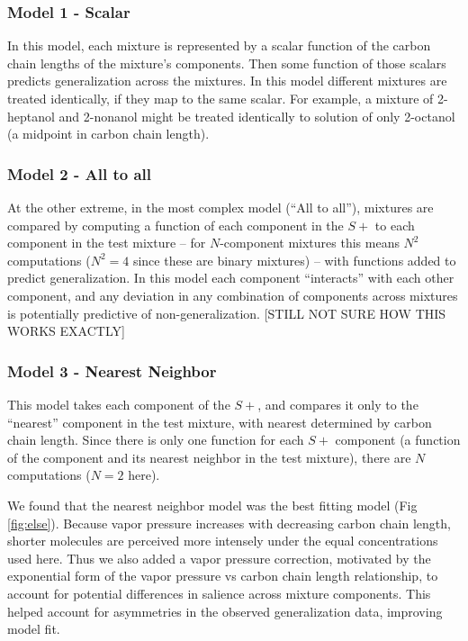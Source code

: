 \subsubsection{Model 1 - Scalar}
\label{sec:scalar_model}
In this model, each mixture is represented by a scalar function of the carbon chain lengths of the mixture’s components.  Then some function of those scalars predicts generalization across the mixtures.  In this model different mixtures are treated identically, if they map to the same scalar.  For example, a mixture of 2-heptanol and 2-nonanol might be treated identically to solution of only 2-octanol (a midpoint in carbon chain length).  

\subsubsection{Model 2 - All to all}
\label{sec:all2all_model}
At the other extreme, in the most complex model (``All to all''), mixtures are compared by computing a function of each component in the $S+$ to each component in the test mixture -- for $N$-component mixtures this means $N^2$ computations ($N^2 = 4$ since these are binary mixtures) -- with functions added to predict generalization.  In this model each component ``interacts'' with each other component, and any deviation in any combination of components across mixtures is potentially predictive of non-generalization.  
[STILL NOT SURE HOW THIS WORKS EXACTLY]

\subsubsection{Model 3 - Nearest Neighbor}
\label{sec:nearest_neighbor_model}
This model takes each component of the $S+$, and compares it only to the ``nearest'' component in the test mixture, with nearest determined by carbon chain length.  Since there is only one function for each $S+$ component (a function of the component and its nearest neighbor in the test mixture), there are $N$ computations ($N=2$ here).  

We found that the nearest neighbor model was the best fitting model (Fig \ref{fig:else}).  Because vapor pressure increases with decreasing carbon chain length, shorter molecules are perceived more intensely under the equal concentrations used here.  Thus we also added a vapor pressure correction, motivated by the exponential form of the vapor pressure vs carbon chain length relationship, to account for potential differences in salience across mixture components.  This helped account for asymmetries in the observed generalization data, improving model fit.  
